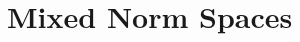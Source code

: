 \begin{comment}
\begin{theorem}
    If $p > 1$,
    \[ \vvvert f \vvvert_{p,q} \leq \frac{p}{p-1} \| f \|_{p,q}. \]
\end{theorem}
\begin{proof}
    We utilize a \emph{Hardy's inequality} technique, which shows that the $L^p$ norm of the averages of a function are comparable to the $L^p$ norm of the function. Applying Minkowski's integral inequality, we conclude that
    \begin{align*}
        \left( \frac{q}{p} \int_0^\infty [t^{1/p} m(t)]^q \frac{dt}{t} \right)^{1/q} &= \left( \frac{q}{p} \int_0^\infty \left( \int_0^1 t^{1/p} f^*(ts)\; ds \right)^q\; \frac{dt}{t} \right)^{1/q}\\
        &\leq \int_0^1 \left( \int_0^\infty \frac{q}{p} (t^{1/p} f^*(ts))^q\; \frac{dt}{t} \right)^{1/q}\; ds\\
        &\leq \left( \int_0^1 s^{- 1/p}\; ds \right) \left( \frac{q}{p} \int_0^\infty (t^{1/p} f^*(t))^q\; \frac{dt}{t} \right)^{1/q}\\
        &\leq \frac{1}{1 - 1/p} \| f \|_{p,q} = \frac{p}{p - 1} \| f \|_{p,q}.
    \end{align*}
    For $q = \infty$, and $t > 0$, we have
    \begin{align*}
        t^{1/p} m(t) &= t^{1/p - 1} \int_0^t f^*(t)\\
        &\leq (\sup_{s > 0} s^{1/p} f^*(s)) t^{1/p - 1} \int_0^t t^{-1/p}\\
        &= \frac{1}{1 - 1/p} \| f \|_{p,\infty} = \frac{p}{p-1} \| f \|_{p,\infty}.
    \end{align*}
    since $t$ was arbitrary, this gives the required bound.
\end{proof}

\end{comment}

\section{Mixed Norm Spaces}

